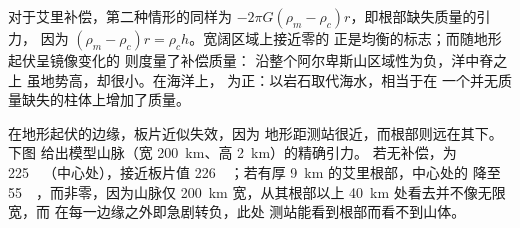 对于艾里补偿，第二种情形的同样为
$-2\pi G(\rho_m - \rho_c)r$，即根部缺失质量的引力，
因为 $(\rho_m - \rho_c)r = \rho_c h$。宽阔区域上接近零的
正是均衡的标志；而随地形起伏呈镜像变化的
则度量了补偿质量：
沿整个阿尔卑斯山区域性为负，洋中脊之上
虽地势高，却很小。在海洋上，
为正：以岩石取代海水，相当于在
一个并无质量缺失的柱体上增加了质量。

在地形起伏的边缘，板片近似失效，因为
地形距测站很近，而根部则远在其下。下图
给出模型山脉（宽 \qty{200}{km}、高 \qty{2}{km}）的精确引力。
若无补偿，为
\qty{+225}{\milli\gal}（中心处），接近板片值
\qty{226}{\milli\gal}；若有厚 \qty{9}{km} 的艾里根部，中心处的
降至 \qty{+55}{\milli\gal}，而非零，因为山脉仅
\qty{200}{km} 宽，从其根部以上 \qty{40}{km} 处看去并不像无限宽，而
在每一边缘之外即急剧转负，此处
测站能看到根部而看不到山体。

